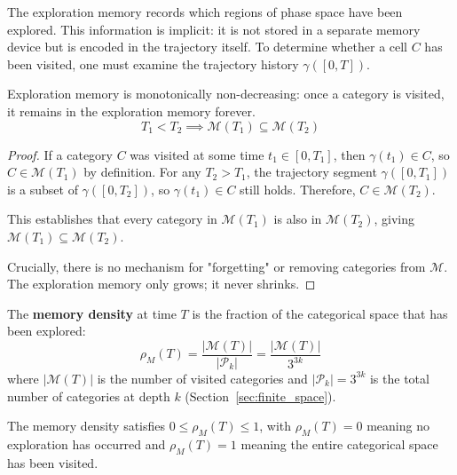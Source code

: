 The exploration memory records which regions of phase space have been explored. This information is implicit: it is not stored in a separate memory device but is encoded in the trajectory itself. To determine whether a cell $C$ has been visited, one must examine the trajectory history $\gamma([0, T])$.

\begin{proposition}
\label{prop:memory_monotonicity}
Exploration memory is monotonically non-decreasing: once a category is visited, it remains in the exploration memory forever.
\begin{equation}
T_1 < T_2 \implies \mathcal{M}(T_1) \subseteq \mathcal{M}(T_2)
\label{eq:memory_monotonicity}
\end{equation}
\end{proposition}

\begin{proof}
If a category $C$ was visited at some time $t_1 \in [0, T_1]$, then $\gamma(t_1) \in C$, so $C \in \mathcal{M}(T_1)$ by definition. For any $T_2 > T_1$, the trajectory segment $\gamma([0, T_1])$ is a subset of $\gamma([0, T_2])$, so $\gamma(t_1) \in C$ still holds. Therefore, $C \in \mathcal{M}(T_2)$.

This establishes that every category in $\mathcal{M}(T_1)$ is also in $\mathcal{M}(T_2)$, giving $\mathcal{M}(T_1) \subseteq \mathcal{M}(T_2)$.

Crucially, there is no mechanism for "forgetting" or removing categories from $\mathcal{M}$. The exploration memory only grows; it never shrinks.
\end{proof}

\begin{definition}
\label{def:memory_density}
The \textbf{memory density} at time $T$ is the fraction of the categorical space that has been explored:
\begin{equation}
\rho_M(T) = \frac{|\mathcal{M}(T)|}{|\mathcal{P}_k|} = \frac{|\mathcal{M}(T)|}{3^{3k}}
\label{eq:memory_density}
\end{equation}
where $|\mathcal{M}(T)|$ is the number of visited categories and $|\mathcal{P}_k| = 3^{3k}$ is the total number of categories at depth $k$ (Section~\ref{sec:finite_space}).

The memory density satisfies $0 \leq \rho_M(T) \leq 1$, with $\rho_M(T) = 0$ meaning no exploration has occurred and $\rho_M(T) = 1$ meaning the entire categorical space has been visited.
\end{definition}

